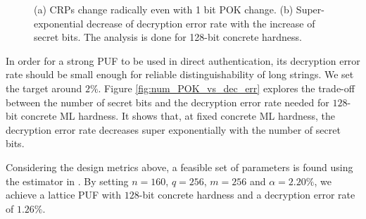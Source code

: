 \begin{figure}[t!] 
    \centering
    \hfill
  \caption{(a) CRPs change radically even with 1 bit POK change. (b) Super-exponential decrease of decryption error rate with the increase of secret bits. The analysis is done for 128-bit concrete hardness.}
  \label{fig: lattice_puf_features} 
\end{figure}

In order for a strong PUF to be used in direct authentication, its decryption error rate should be small enough for reliable distinguishability of long strings.
We set the target around $2\%$.
Figure \ref{fig:num_POK_vs_dec_err} explores the trade-off between the number of secret bits and the decryption error rate needed for $128$-bit concrete ML hardness.
It shows that, at fixed concrete ML hardness, the decryption error rate decreases super exponentially with the number of secret bits. 

Considering the design metrics above, a feasible set of parameters is found using the estimator in \cite{albrecht2015concrete}.
By setting $n=160$, $q=256$, $m=256$ and $\alpha = 2.20\%$, we achieve a lattice PUF with $128$-bit concrete hardness and a decryption error rate of $1.26\%$.

